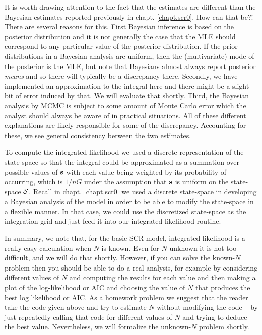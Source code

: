 It is worth drawing attention to the fact that the estimates are
different than the Bayesian estimates reported previously in chapt. \ref{chapt.scr0}.
How can that be?!  There are several reasons for
this.  First Bayesian inference is based on the posterior distribution
and it is not generally the case that the MLE should correspond to any
particular value of the posterior distribution. If the prior
distributions in a Bayesian analysis are uniform, then the
(multivariate) mode of the
posterior is the MLE, but note that Bayesians almost always report
posterior {\it means} and so there will typically be a discrepancy
there. Secondly, we have implemented an approximation to the integral
here and there might be a slight bit of error induced by that. We will
evaluate that shortly. Third, the Bayesian analysis by MCMC is subject
to some amount of Monte Carlo error which the analyst should always be
aware of in practical situations.  All of these different explanations
are likely responsible for some of the discrepancy. Accounting for
these, we see general consistency between the
two estimates.

To compute the integrated likelihood we used a discrete representation
of the state-space so that the integral could be approximated as a
summation over possible values of ${\bf s}$ with each value being
weighted by its probability of occurring, which is $1/nG$ under the
assumption that ${\bf s}$ is uniform on the state-space ${\cal
  S}$. Recall
in chapt. \ref{chapt.scr0} we 
used a discrete state-space in developing a Bayesian analysis of the
model in order to be able to modify the state-space in a flexible
manner. In that case, we could use the discretized state-space as the
integration grid and just feed it into our integrated likelihood
routine. 

In summary, we note that, for the basic SCR model, integrated
likelihood is a really easy calculation when $N$ is known. Even for $N$
unknown it is not too difficult, and we will do that shortly.
However, if you can solve the known-$N$ problem then you should be able
to do a real analysis, for example by considering different values of
$N$ and computing the results for each value and then making a plot of
the log-likelihood or AIC and choosing the value of $N$ that produces
the best log likelihood or AIC. As a homework problem we suggest that
the reader take the code given above and try to estimate $N$ without
modifying the code – by just repeatedly calling that code for
different values of $N$ and trying to deduce the best value.
Nevertheless, we will formalize the unknown-$N$ problem shortly.

